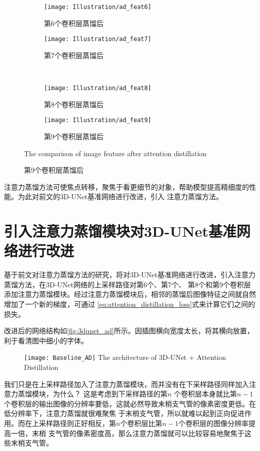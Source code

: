 \begin{figure}[!htp]
	\centering
	\begin{subfigure}{0.45\textwidth}
		\texttt{[image: Illustration/ad\_feat6]}
		\caption{第6个卷积层蒸馏后}
	\end{subfigure}
	\hfill
	\begin{subfigure}{0.45\textwidth}
		\texttt{[image: Illustration/ad\_feat7]}
		\caption{第7个卷积层蒸馏后}
	\end{subfigure}
	\\
	\begin{subfigure}{0.45\textwidth}
		\texttt{[image: Illustration/ad\_feat8]}
		\caption{第8个卷积层蒸馏后}
	\end{subfigure}
	\hfill
	\begin{subfigure}{0.45\textwidth}
		\texttt{[image: Illustration/ad\_feat9]}
		\caption{第9个卷积层蒸馏后}
	\end{subfigure}
        {The comparison of image feature after attention distillation}
	\label{tbl:ad_effect}
\end{figure}

注意力蒸馏方法可使焦点转移，聚焦于看更细节的对象，帮助模型提高精细度的性能。为此对前文的3D-UNet基准网络进行改进，引入
注意力蒸馏方法。

\section{引入注意力蒸馏模块对3D-UNet基准网络进行改进}
基于前文对注意力蒸馏方法的研究，将对3D-UNet基准网络进行改进，引入注意力蒸馏方法，在3D-UNet网络的上采样路径对第6个、第7个、
第8个和第9个卷积层添加注意力蒸馏模块。经过注意力蒸馏模块后，相邻的蒸馏后图像特征之间就自然增加了一个新的梯度，可通过
\ref{eq:attention_distillation_loss}式来计算它们之间的损失。

改进后的网络结构如\autoref{fig:3dunet_ad}所示。因插图横向宽度太长，将其横向放置，利于看清图中细小的字体。
\begin{figure}[!ht]
    \centering
    \texttt{[image: Baseline\_AD]}
        {The architecture of 3D-UNet + Attention Distillation}
    \label{fig:3dunet_ad}
\end{figure}
我们只是在上采样路径加入了注意力蒸馏模块，而并没有在下采样路径同样加入注意力蒸馏模块，为什么？ 这是考虑到下采样路径的第$n$
个卷积层本身就比第$n-1$个卷积层的输出图像的分辨率要低，这就必然导致末梢支气管的像素密度更低。在低分辨率下，注意力蒸馏就很难聚焦
于末梢支气管，所以就难以起到正向促进作用。而在上采样路径则正好相反，第$n$个卷积层比第$n-1$个卷积层的图像分辨率提高一倍，末梢
支气管的像素密度高，那么注意力蒸馏就可以比较容易地聚焦于这些末梢支气管。


